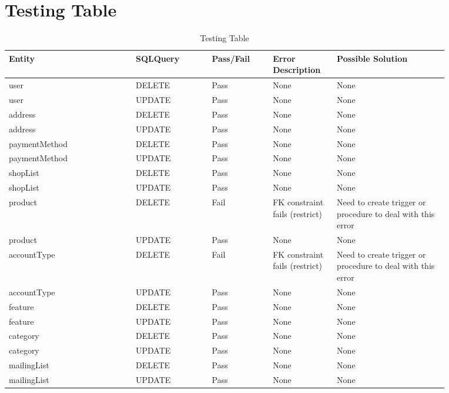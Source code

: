 \pagebreak
\section{Testing Table}

\begin{spacing}{1.25}
\begin{longtable}{ | p{0.25\linewidth} | p{0.15\linewidth} | p{0.126\linewidth} | p{0.128\linewidth} | p{0.22\linewidth} | }
\caption{Testing Table}\\
\hline
Entity						&	SQLQuery	&	Pass/Fail	&	Error Description				&	Possible Solution\\\hline
user						&	DELETE		&	Pass		&	None							&	None				\\\hline
user						&	UPDATE		&	Pass		&	None							&	None				\\\hline
address						&	DELETE		&	Pass		&	None							&	None				\\\hline
address						&	UPDATE		&	Pass		&	None							&	None				\\\hline
paymentMethod				&	DELETE		&	Pass		&	None							&	None				\\\hline
paymentMethod				&	UPDATE		&	Pass		&	None							&	None				\\\hline
shopList					&	DELETE		&	Pass		&	None							&	None				\\\hline
shopList					&	UPDATE		&	Pass		&	None							&	None				\\\hline
product						&	DELETE		&	Fail		&	FK constraint fails (restrict)	&	Need to create trigger or procedure to deal with this error\\\hline
product						&	UPDATE		&	Pass		&	None							&	None				\\\hline
accountType					&	DELETE		&	Fail		&	FK constraint fails (restrict)	&	Need to create trigger or procedure to deal with this error\\\hline
accountType					&	UPDATE		&	Pass		&	None							&	None				\\\hline
feature						&	DELETE		&	Pass		&	None							&	None				\\\hline
feature						&	UPDATE		&	Pass		&	None							&	None				\\\hline
category					&	DELETE		&	Pass		&	None							&	None				\\\hline
category					&	UPDATE		&	Pass		&	None							&	None				\\\hline
mailingList					&	DELETE		&	Pass		&	None							&	None				\\\hline
mailingList					&	UPDATE		&	Pass		&	None							&	None				\\\hline

\end{longtable}
\end{spacing}
